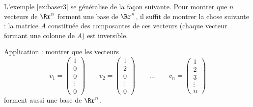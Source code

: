 \documentclass[class=report,crop=false]{standalone}
\begin{document}
\begin{remarque*}
L'exemple \ref{ex:baser3} se généralise de la façon
suivante. Pour montrer que $n$ vecteurs de $\Rr^n$ forment une base
de $\Rr^n$, il suffit de montrer la chose suivante : la matrice $A$
constituée des composantes de ces vecteurs (chaque vecteur formant
une colonne de $A$) est inversible.

\bigskip

Application : montrer que les vecteurs
$$
v_1 = \left(\begin{smallmatrix}1\\0\\0\\\vdots\\0\end{smallmatrix}\right) \qquad
v_2 = \left(\begin{smallmatrix}1\\2\\0\\\vdots\\0\end{smallmatrix}\right) \qquad \ldots \qquad
v_n = \left(\begin{smallmatrix}1\\2\\3\\\vdots\\n\end{smallmatrix}\right)$$
forment aussi une base de $\Rr^n$.
\end{remarque*}

\bigskip
\end{document}
